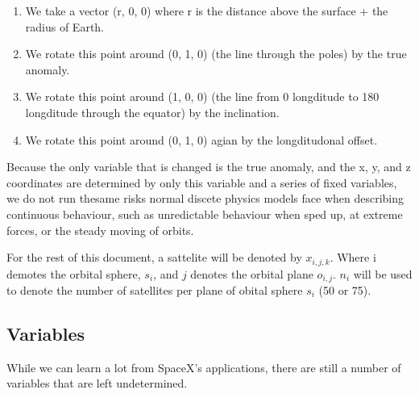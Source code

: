 \documentclass[12pt]{article}
\begin{document}
\begin{enumerate}
\item We take a vector (r, 0, 0) where r is the distance above the surface + the radius of Earth.
\item We rotate this point around (0, 1, 0) (the line through the poles) by the true anomaly.
\item We rotate this point around (1, 0, 0) (the line from 0 longditude to 180 longditude through the equator) by the inclination.
\item We rotate this point around (0, 1, 0) agian by the longditudonal offset.
\end{enumerate}

Because the only variable that is changed is the true anomaly, and the x, y, and z coordinates are determined by only this variable and a series of fixed variables, we do not run thesame risks normal discete physics models face when describing continuous behaviour, such as unredictable behaviour when sped up, at extreme forces, or the steady moving of orbits.

For the rest of this document, a sattelite will be denoted by $x_{i,j,k}$. Where i demotes the orbital sphere, $s_i$, and $j$ denotes the orbital plane $o_{i,j}$. $n_i$ will be used to denote the number of satellites per plane of obital sphere $s_i$ (50 or 75).

\subsection{Variables}
While we can learn a lot from SpaceX's applications, there are still a number of variables that are left undetermined. 
\end{document}
